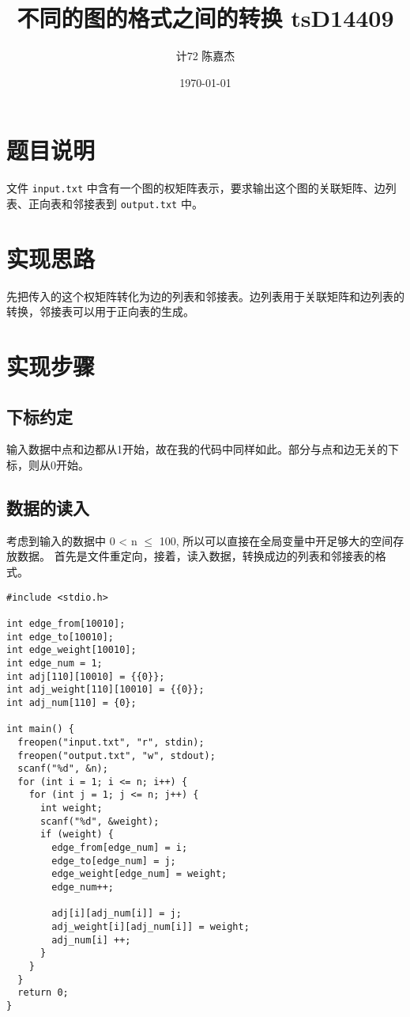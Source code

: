 \documentclass[11pt]{article}
\author{计72 陈嘉杰}
\date{\today}
\title{不同的图的格式之间的转换 tsD14409}
\begin{document}
\maketitle
\tableofcontents

\section{题目说明}
\label{sec:orgb461eab}
文件 \texttt{input.txt} 中含有一个图的权矩阵表示，要求输出这个图的关联矩阵、边列表、正向表和邻接表到 \texttt{output.txt} 中。

\section{实现思路}
\label{sec:orgc182ded}
先把传入的这个权矩阵转化为边的列表和邻接表。边列表用于关联矩阵和边列表的转换，邻接表可以用于正向表的生成。

\section{实现步骤}
\label{sec:org9a66093}
\subsection{下标约定}
\label{sec:orgf8a23b4}
输入数据中点和边都从1开始，故在我的代码中同样如此。部分与点和边无关的下标，则从0开始。
\subsection{数据的读入}
\label{sec:org922e68e}

考虑到输入的数据中 0 < n \(\le\) 100, 所以可以直接在全局变量中开足够大的空间存放数据。
首先是文件重定向，接着，读入数据，转换成边的列表和邻接表的格式。

\begin{verbatim}
#include <stdio.h>

int edge_from[10010];
int edge_to[10010];
int edge_weight[10010];
int edge_num = 1;
int adj[110][10010] = {{0}};
int adj_weight[110][10010] = {{0}};
int adj_num[110] = {0};

int main() {
  freopen("input.txt", "r", stdin);
  freopen("output.txt", "w", stdout);
  scanf("%d", &n);
  for (int i = 1; i <= n; i++) {
    for (int j = 1; j <= n; j++) {
      int weight;
      scanf("%d", &weight);
      if (weight) {
        edge_from[edge_num] = i;
        edge_to[edge_num] = j;
        edge_weight[edge_num] = weight;
        edge_num++;

        adj[i][adj_num[i]] = j;
        adj_weight[i][adj_num[i]] = weight;
        adj_num[i] ++;
      }
    }
  }
  return 0;
}
\end{verbatim}
\end{document}
